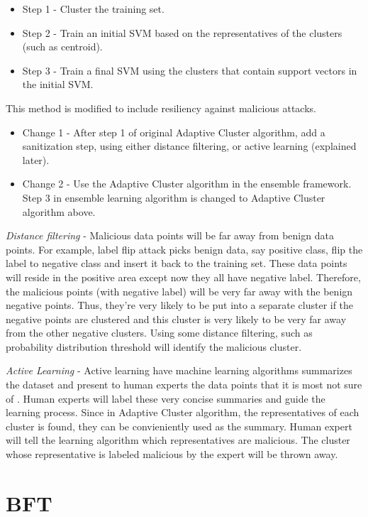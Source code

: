 \documentclass[10pt,conference,compsocconf,letterpaper]{IEEEtran}
\begin{document}
\begin{itemize}
\item Step 1 - Cluster the training set.
\item Step 2 - Train an initial SVM based on the representatives of the clusters (such as centroid).
\item Step 3 - Train a final SVM using the clusters that contain support vectors in the initial SVM.
\end{itemize}

This method is modified to include resiliency against malicious attacks.

\begin{itemize}
\item Change 1 - After step 1 of original Adaptive Cluster algorithm, add a sanitization step, using either distance filtering, or active learning (explained later).
\item Change 2 - Use the Adaptive Cluster algorithm in the ensemble framework. Step 3 in ensemble learning algorithm is changed to Adaptive Cluster algorithm above.
\end{itemize}

\textit{Distance filtering} - Malicious data points will be far away from benign data points. For example, label flip attack \cite{xiao12} picks benign data, say positive class, flip the label to negative class and insert it back to the training set. These data points will reside in the positive area except now they all have negative label. Therefore, the malicious points (with negative label) will be very far away with the benign negative points. Thus, they're very likely to be put into a separate cluster if the negative points are clustered and this cluster is very likely to be very far away from the other negative clusters. Using some distance filtering, such as probability distribution threshold will identify the malicious cluster.

\textit{Active Learning} - Active learning have machine learning algorithms summarizes the dataset and present to human experts the data points that it is most not sure of \cite{reghavan06}. Human experts will label these very concise summaries and guide the learning process. Since in Adaptive Cluster algorithm, the representatives of each cluster is found, they can be convieniently used as the summary. Human expert will tell the learning algorithm which representatives are malicious. The cluster whose representative is labeled malicious by the expert will be thrown away.

\section{BFT}
\end{document}
